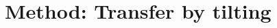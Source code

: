 \documentclass[11pt]{article}
\theoremstyle{definition}
\numberwithin{equation}{section}%
\begin{document}




\section{Method: Transfer by tilting}
\end{document}
